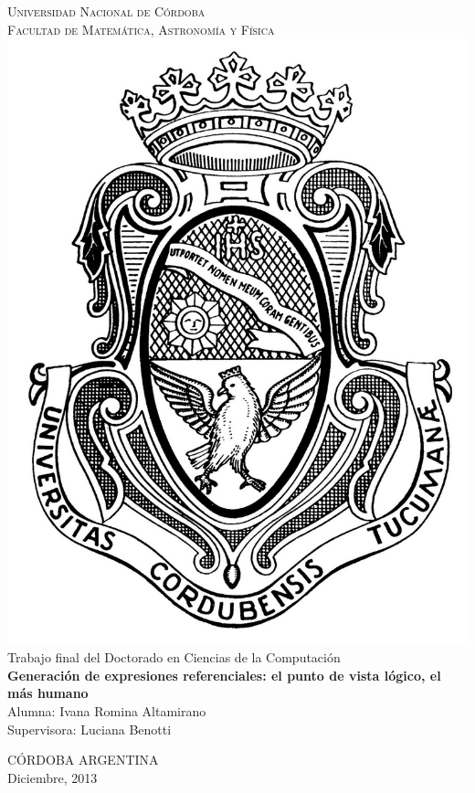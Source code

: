\thispagestyle{empty}

\begin{titlepage}
\begin{center}

{ \vspace*{1cm} }
\huge{\textsc{\textmd{Universidad Nacional de C\'ordoba}}}\\[1cm]
\Large{\textsc{\textmd{Facultad de Matem\'atica, Astronom\'ia y F\'isica}}}\\[1cm]

\includegraphics[scale=0.1]{preliminar/unc}\\[1.3cm]

\Large{Trabajo final del Doctorado en Ciencias de la Computaci\'on}\\[1cm]

\LARGE{\textbf{Generaci\'on de expresiones referenciales: el punto de vista l\'ogico, el m\'as humano }}\\[2cm]

\Large{Alumna: Ivana Romina Altamirano}\\[1.3cm]

\Large{Supervisora: Luciana Benotti}

\vfill
\vfill

\large{C\'ORDOBA } \large{ARGENTINA}\\ 
\large{Diciembre, 2013}


\end{center}
\end{titlepage}
